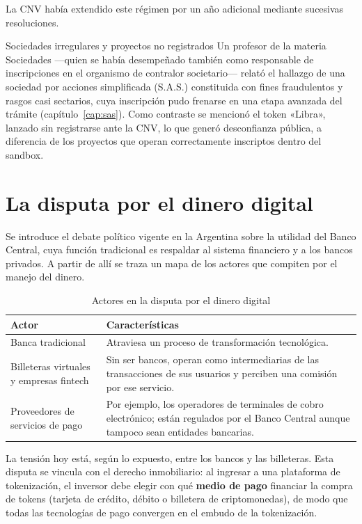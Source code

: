 \documentclass[12pt,oneside]{book}
\begin{document}
La CNV había extendido este régimen por un año adicional mediante sucesivas resoluciones.

\begin{example}{Sociedades irregulares y proyectos no registrados}
Un profesor de la materia Sociedades ---quien se había desempeñado también como responsable de inscripciones en el organismo de contralor societario--- relató el hallazgo de una sociedad por acciones simplificada (S.A.S.) constituida con fines fraudulentos y rasgos casi sectarios, cuya inscripción pudo frenarse en una etapa avanzada del trámite (capítulo~\ref{cap:sas}). Como contraste se mencionó el token «Libra», lanzado sin registrarse ante la CNV, lo que generó desconfianza pública, a diferencia de los proyectos que operan correctamente inscriptos dentro del sandbox.
\end{example}

\section{La disputa por el dinero digital}

Se introduce el debate político vigente en la Argentina sobre la utilidad del Banco Central, cuya función tradicional es respaldar al sistema financiero y a los bancos privados. A partir de allí se traza un mapa de los actores que compiten por el manejo del dinero.

\begin{table}[H]
\centering
\caption{Actores en la disputa por el dinero digital}
\renewcommand{\arraystretch}{1.2}
\begin{tabularx}{\textwidth}{>{\raggedright\arraybackslash}p{}X}
\toprule
\textbf{Actor} & \textbf{Características} \\
\midrule
Banca tradicional & Atraviesa un proceso de transformación tecnológica. \\
Billeteras virtuales y empresas fintech & Sin ser bancos, operan como intermediarias de las transacciones de sus usuarios y perciben una comisión por ese servicio. \\
Proveedores de servicios de pago & Por ejemplo, los operadores de terminales de cobro electrónico; están regulados por el Banco Central aunque tampoco sean entidades bancarias. \\
\bottomrule
\end{tabularx}
\end{table}

La tensión hoy está, según lo expuesto, entre los bancos y las billeteras. Esta disputa se vincula con el derecho inmobiliario: al ingresar a una plataforma de tokenización, el inversor debe elegir con qué \textbf{medio de pago} financiar la compra de tokens (tarjeta de crédito, débito o billetera de criptomonedas), de modo que todas las tecnologías de pago convergen en el embudo de la tokenización.
\end{document}
